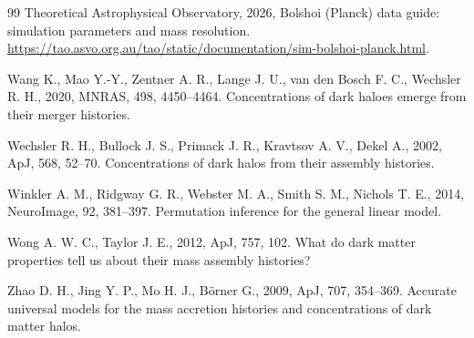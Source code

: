 \begin{thebibliography}{99}
Theoretical Astrophysical Observatory, 2026, Bolshoi (Planck) data guide: simulation parameters and mass resolution. \url{https://tao.asvo.org.au/tao/static/documentation/sim-bolshoi-planck.html}.

Wang K., Mao Y.-Y., Zentner A. R., Lange J. U., van den Bosch F. C., Wechsler R. H., 2020, MNRAS, 498, 4450--4464. Concentrations of dark haloes emerge from their merger histories. 

Wechsler R. H., Bullock J. S., Primack J. R., Kravtsov A. V., Dekel A., 2002, ApJ, 568, 52--70. Concentrations of dark halos from their assembly histories. 

Winkler A. M., Ridgway G. R., Webster M. A., Smith S. M., Nichols T. E., 2014, NeuroImage, 92, 381--397. Permutation inference for the general linear model. 

Wong A. W. C., Taylor J. E., 2012, ApJ, 757, 102. What do dark matter properties tell us about their mass assembly histories? 

Zhao D. H., Jing Y. P., Mo H. J., B\"orner G., 2009, ApJ, 707, 354--369. Accurate universal models for the mass accretion histories and concentrations of dark matter halos. 

\end{thebibliography}
